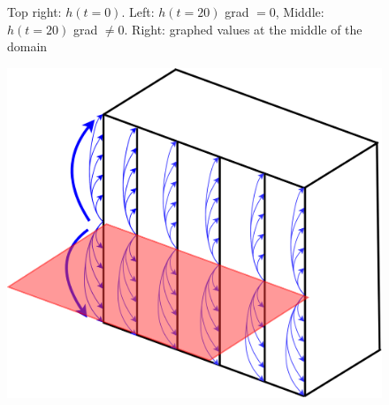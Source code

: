 \begin{frame}
\begin{figure}[htp]
\caption{Top right: $h(t=0)$. Left: $h(t=20)$ grad $=0$, Middle: $h(t=20)$ grad $\neq0$. Right: graphed values at the middle of the domain}
\label{fig:figure3}
\end{figure}

\end{frame}

%
%
%
%
%



\begin{frame}

\begin{figure}
\includegraphics[scale=0.5]{./Resources/Images/mapping23.png}%
\end{figure}

\end{frame}


